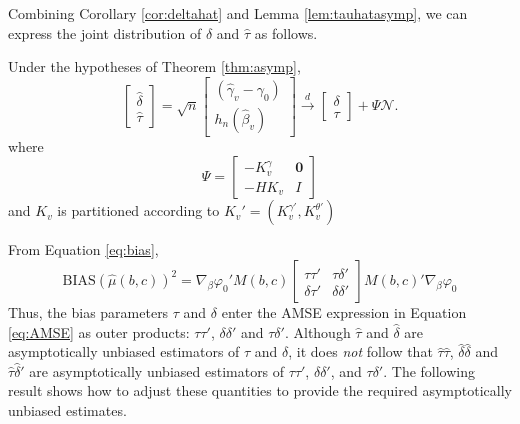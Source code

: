 Combining Corollary \ref{cor:deltahat} and Lemma \ref{lem:tauhatasymp}, we can express the joint distribution of $\widehat{\delta}$ and $\widehat{\tau}$ as follows.

\begin{thm}
\label{thm:jointbias}
Under the hypotheses of Theorem \ref{thm:asymp},
	$$\left[\begin{array}{c}\widehat{\delta}\\ \widehat{\tau}\end{array}\right] = \sqrt{n}\left[\begin{array}{c}\left(\widehat{\gamma}_v-\gamma_0\right)\\h_n(\widehat{\beta}_v)\end{array}\right]
	\overset{d}{\rightarrow} \left[\begin{array}{c}\delta\\ \tau\end{array} \right] +\Psi \mathscr{N}. $$
	where $$\Psi = \left[\begin{array}{cc} -K_{v}^\gamma&\mathbf{0} \\ -HK_v&I\end{array}\right]$$
and $K_v$ is partitioned according to $K_v' = (K_v^{\gamma '}, K_v^{\theta '})$
\end{thm}
From Equation \ref{eq:bias},
$$\mbox{BIAS}\left(\widehat{\mu}\left(b,c\right)\right)^2 = \nabla_\beta \varphi_0' M(b,c) \left[\begin{array}{cc}  \tau \tau'& \tau \delta'\\ \delta \tau'& \delta \delta'\end{array}\right] M(b,c)' \nabla_\beta \varphi_0$$
Thus, the bias parameters $\tau$ and $\delta$ enter the AMSE expression in Equation \ref{eq:AMSE} as outer products: $\tau\tau'$, $\delta\delta'$ and $\tau\delta'$.
Although $\widehat{\tau}$ and $\widehat{\delta}$ are asymptotically unbiased estimators of $\tau$ and $\delta$, it does \emph{not} follow that $\widehat{\tau}\widehat{\tau}$, $\widehat{\delta}\widehat{\delta}$ and $\widehat{\tau}\widehat{\delta}'$ are  asymptotically unbiased estimators of $\tau\tau'$, $\delta\delta'$, and $\tau\delta'$. 
The following result shows how to adjust these quantities to provide the required asymptotically unbiased estimates. 

